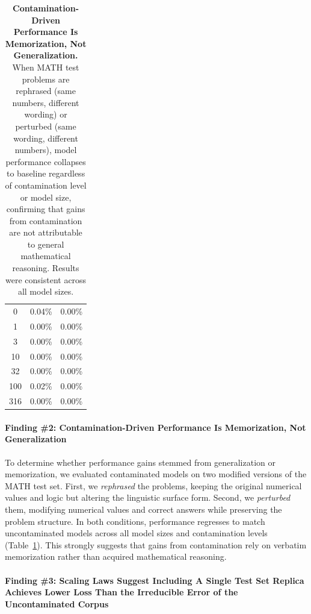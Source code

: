 \begin{table}[t!]
\begin{minipage}{0.32\textwidth}
\begin{tabular}{crr}
            \midrule
            0    & 0.04\% & 0.00\% \\
            1    & 0.00\% & 0.00\% \\
            3    & 0.00\% & 0.00\% \\
            10   & 0.00\% & 0.00\% \\
            32   & 0.00\% & 0.00\% \\
            100  & 0.02\% & 0.00\% \\
            316  & 0.00\% & 0.00\% \\
            \bottomrule
        \end{tabular}
    \end{minipage}
    \caption{\textbf{Contamination-Driven Performance Is Memorization, Not Generalization.} When MATH test problems are rephrased (same numbers, different wording) or perturbed (same wording, different numbers), model performance collapses to baseline regardless of contamination level or model size, confirming that gains from contamination are not attributable to general mathematical reasoning. Results were consistent across all model sizes.}
    \label{tab:rephrase_perturb}
\end{table}

\paragraph{Finding \#2: Contamination-Driven Performance Is Memorization, Not Generalization}
To determine whether performance gains stemmed from generalization or memorization, we evaluated contaminated models on two modified versions of the MATH test set. First, we \emph{rephrased} the problems, keeping the original numerical values and logic but altering the linguistic surface form. Second, we \emph{perturbed} them, modifying numerical values and correct answers while preserving the problem structure. In both conditions, performance regresses to match uncontaminated models across all model sizes and contamination levels (Table~\ref{tab:rephrase_perturb}). This strongly suggests that gains from contamination rely on verbatim memorization rather than acquired mathematical reasoning.

\paragraph{Finding \#3: Scaling Laws Suggest Including A Single Test Set Replica Achieves Lower Loss Than the Irreducible Error of the Uncontaminated Corpus}



